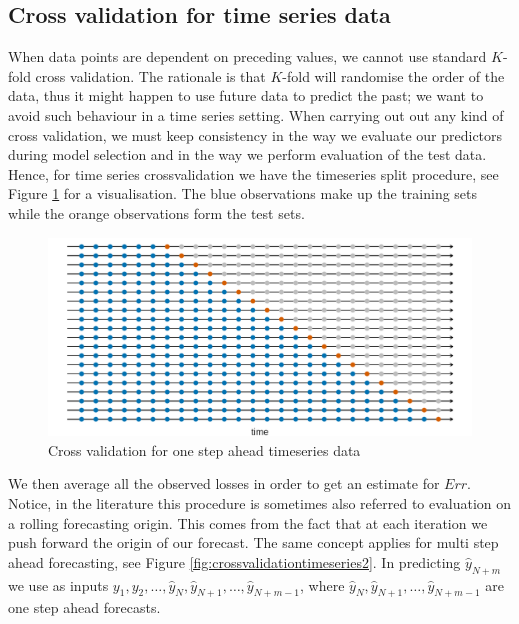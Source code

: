 \subsection{Cross validation for time series data}
When data points are dependent on preceding values, we cannot use standard $K$-fold cross validation. The rationale is that $K$-fold will randomise the order of the data, thus it might happen to use future data to predict the past; we want to avoid such behaviour in a time series setting. 
When carrying out out any kind of cross validation, we must keep consistency in the way we evaluate our predictors during model selection and in the way we perform evaluation of the test data.
Hence, for time series crossvalidation we have the timeseries split procedure, see Figure \ref{fig:crossvalidationtimeseries} for a visualisation. The blue observations make up the training sets while the orange observations form the test sets.
\begin{figure}
    \includegraphics[width=\textwidth]{images/crossvalidationtimeseries.png}
    \caption{Cross validation for one step ahead timeseries data \cite{hyndman2018forecasting}}
    \label{fig:crossvalidationtimeseries}
\end{figure}
We then average all the observed losses in order to get an estimate for $Err$.
Notice, in the literature this procedure is sometimes also referred to evaluation on a rolling forecasting origin. This comes from the fact that at each iteration we push forward the origin of our forecast.
The same concept applies for multi step ahead forecasting, see Figure \ref{fig:crossvalidationtimeseries2}.
In predicting $\hat{y}_{N+m}$ we use as inputs $y_1, y_2, \dots, \hat{y}_{N},\hat{y}_{N+1},\dots, \hat{y}_{N+m-1}$, where $\hat{y}_{N},\hat{y}_{N+1},\dots, \hat{y}_{N+m-1}$ are one step ahead forecasts.
